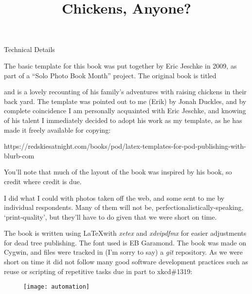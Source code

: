 \newpage

{\LARGE Technical Details}

The basic template for this book was put together by Eric Jeschke in
2009, as part of a ``Solo Photo Book Month'' project.  The original book
is titled \title{Chickens, Anyone?} and is a lovely recounting of his
family's adventures with raising chickens in their back yard.  The template
was pointed out to me (Erik) by Jonah Duckles, and by complete coincidence
I am personally acquainted with Eric Jeschke, and knowing of his talent I
immediately decided to adopt his work as my template, as he has made it
freely available for copying:

https://redskiesatnight.com/books/pod/latex-templates-for-pod-publishing-with-blurb-com

You'll note that much of the layout of the book was inspired by his book,
so credit where credit is due.

I did what I could with photos taken off the web, and some sent to me by
individual respondents.  Many of them will not be,
perfectionalistically-speaking, `print-quality', but they'll have to do given
that we were short on time.

The book is written using \LaTeX with {\em xetex} and {\em xdvipdfmx} for
easier adjustments for dead tree publishing.  The font used is EB Garamond.
The book was made on Cygwin, and files were tracked in (I'm sorry to say) a
{\em git} repository.  As we were short on time it did not follow many good
software development practices such as reuse or scripting of repetitive tasks
due in part to xkcd\#1319:
\begin{figure}[h!]
\centering
\texttt{[image: automation]}
\end{figure}

